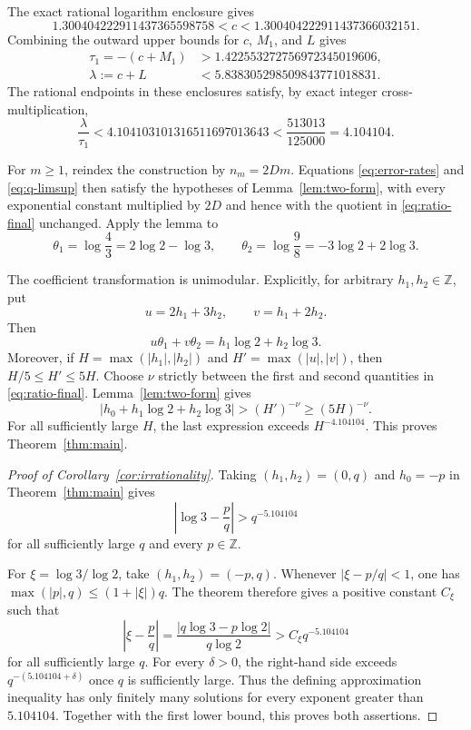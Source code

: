 \documentclass[preprint,12pt]{elsarticle}
\theoremstyle{definition}
\newcommand{\Z}{\mathbb Z}
\newcommand{\abs}[1]{\left|#1\right|}
\begin{document}
The exact rational logarithm enclosure gives
\begin{equation}\label{eq:c-bounds}
 1.300404222911437365598758
 <c<
 1.300404222911437366032151.
\end{equation}
Combining the outward upper bounds for $c$, $M_1$, and $L$ gives
\begin{align}
 \tau_1=-(c+M_1)
 &>1.422553272756972345019606,
 \label{eq:tau-final}\\
 \lambda:=c+L
 &<5.838305298509843771018831.
 \label{eq:lambda-final}
\end{align}
The rational endpoints in these enclosures satisfy, by exact integer
cross-multiplication,
\begin{equation}\label{eq:ratio-final}
 \frac{\lambda}{\tau_1}
 <4.104103101316511697013643
 <\frac{513013}{125000}
 =4.104104.
\end{equation}

For $m\ge1$, reindex the construction by $n_m=2Dm$.  Equations
\eqref{eq:error-rates} and \eqref{eq:q-limsup} then satisfy the hypotheses of
Lemma~\ref{lem:two-form}, with every exponential constant multiplied by
$2D$ and hence with the quotient in \eqref{eq:ratio-final} unchanged.
Apply the lemma to
\[
 \theta_1=\log\frac43=2\log2-\log3,
 \qquad
 \theta_2=\log\frac98=-3\log2+2\log3.
\]

The coefficient transformation is unimodular.  Explicitly, for arbitrary
$h_1,h_2\in\Z$, put
\begin{equation}\label{eq:unimodular}
 u=2h_1+3h_2,
 \qquad
 v=h_1+2h_2.
\end{equation}
Then
\[
 u\theta_1+v\theta_2=h_1\log2+h_2\log3.
\]
Moreover, if $H=\max(|h_1|,|h_2|)$ and
$H'=\max(|u|,|v|)$, then $H/5\le H'\le5H$.
Choose $\nu$ strictly between the first and second quantities in
\eqref{eq:ratio-final}.  Lemma~\ref{lem:two-form} gives
\[
 \abs{h_0+h_1\log2+h_2\log3}
 >(H')^{-\nu}\ge(5H)^{-\nu}.
\]
For all sufficiently large $H$, the last expression exceeds
$H^{-4.104104}$.  This proves Theorem~\ref{thm:main}.

\begin{proof}[Proof of Corollary~\ref{cor:irrationality}]
Taking $(h_1,h_2)=(0,q)$ and $h_0=-p$ in
Theorem~\ref{thm:main} gives
\[
 \abs{\log3-\frac pq}>q^{-5.104104}
\]
for all sufficiently large $q$ and every $p\in\Z$.

For $\xi=\log3/\log2$, take $(h_1,h_2)=(-p,q)$.  Whenever
$|\xi-p/q|<1$, one has
$\max(|p|,q)\le(1+|\xi|)q$.  The theorem therefore gives a positive
constant $C_\xi$ such that
\[
 \abs{\xi-\frac pq}
 =\frac{\abs{q\log3-p\log2}}{q\log2}
 >C_\xi q^{-5.104104}
\]
for all sufficiently large $q$.  For every $\delta>0$, the right-hand side
exceeds $q^{-(5.104104+\delta)}$ once $q$ is sufficiently large.  Thus the
defining approximation inequality has only finitely many solutions for every
exponent greater than $5.104104$.  Together with the first lower bound, this
proves both assertions.
\end{proof}
\end{document}

